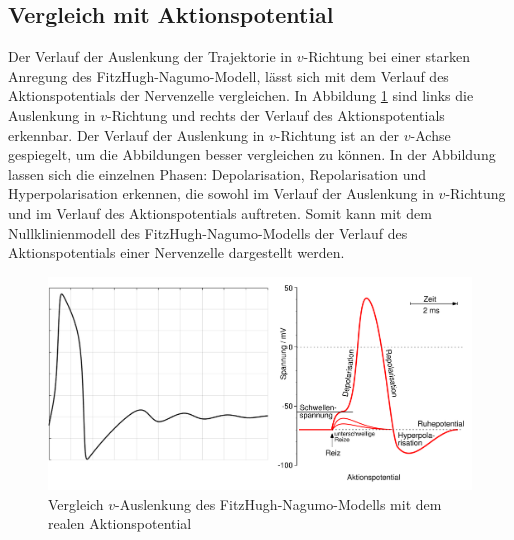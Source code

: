 \subsection{Vergleich mit Aktionspotential}
Der Verlauf der Auslenkung der Trajektorie in $v$-Richtung bei einer starken Anregung des FitzHugh-Nagumo-Modell, lässt
sich mit dem Verlauf des Aktionspotentials der Nervenzelle vergleichen. 
In Abbildung \ref{fig:Vergleich} sind links die Auslenkung in $v$-Richtung und rechts der Verlauf des Aktionspotentials
erkennbar.
Der Verlauf der Auslenkung in $v$-Richtung ist an der $v$-Achse gespiegelt, um die Abbildungen besser vergleichen zu können.
In der Abbildung lassen sich die einzelnen Phasen: Depolarisation, Repolarisation und Hyperpolarisation erkennen, die
sowohl im Verlauf der Auslenkung in $v$-Richtung und im Verlauf des Aktionspotentials auftreten.
Somit kann mit dem Nullklinienmodell des FitzHugh-Nagumo-Modells der Verlauf des Aktionspotentials einer Nervenzelle
dargestellt werden.
\begin{figure}
    \centering
    \includegraphics[width=\textwidth]{papers/nerven/Bilder/Vergleich.png}
    \caption{Vergleich $v$-Auslenkung des FitzHugh-Nagumo-Modells mit dem realen Aktionspotential}
    \label{fig:Vergleich}
\end{figure}
